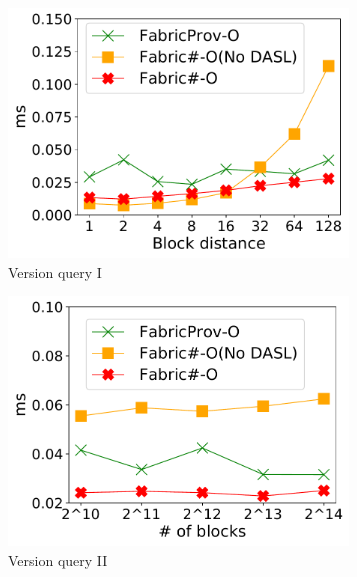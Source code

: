 \begin{figure}[t]
	\centering
    \begin{subfigure}{0.3\textwidth}
      \includegraphics[width=0.99\textwidth]{chart/provenance/ycsb_dist_query.pdf}
      \caption{Version query I}
      \label{chart:provenance:ycsb_dist_query}
    \end{subfigure}
    \begin{subfigure}{0.3\textwidth}
      \includegraphics[width=0.99\textwidth]{chart/provenance/ycsb_blk_query.pdf}
      \caption{Version query II}
      \label{chart:provenance:ycsb_blk_query}
    \end{subfigure}
    \begin{subfigure}{0.3\textwidth}

\end{subfigure}
\end{figure}
